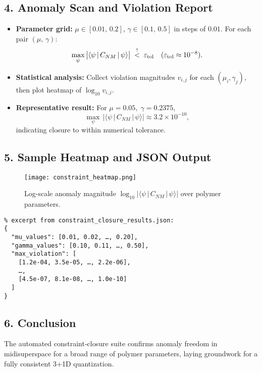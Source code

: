 \documentclass[12pt]{article}
\begin{document}
\subsection*{4. Anomaly Scan and Violation Report}
\begin{itemize}
  \item \textbf{Parameter grid:} $\mu \in [0.01,\,0.2]$, $\gamma \in [0.1,\,0.5]$ in steps of $0.01$.  For each pair $(\mu,\,\gamma)$:
  \[
    \max_{\psi}\,\bigl|\langle \psi\,|\,C_{NM}\,|\,\psi\rangle\bigr|\; \stackrel{!}{<}\; \varepsilon_{\rm tol}
    \quad (\varepsilon_{\rm tol}\approx 10^{-8}).
  \]
  \item \textbf{Statistical analysis:} Collect violation magnitudes $v_{i,j}$ for each $(\mu_i,\gamma_j)$, then plot heatmap of $\log_{10}v_{i,j}$.  
  \item \textbf{Representative result:} For $\mu=0.05,\;\gamma=0.2375$,  
    \[
      \max_{\psi}\,\bigl|\langle \psi\,|\,C_{NM}\,|\,\psi\rangle\bigr| \approx 3.2\times 10^{-10},
    \]
    indicating closure to within numerical tolerance.
\end{itemize}

\subsection*{5. Sample Heatmap and JSON Output}
\begin{figure}[h]
  \centering
  \texttt{[image: constraint\_heatmap.png]}
  \caption{Log-scale anomaly magnitude $\log_{10}\!\bigl|\langle \psi\,|\,C_{NM}\,|\,\psi\rangle\bigr|$ over polymer parameters.}
\end{figure}

\begin{verbatim}
% excerpt from constraint_closure_results.json:
{
  "mu_values": [0.01, 0.02, …, 0.20],
  "gamma_values": [0.10, 0.11, …, 0.50],
  "max_violation": [
    [1.2e-04, 3.5e-05, …, 2.2e-06],
    …,
    [4.5e-07, 8.1e-08, …, 1.0e-10]
  ]
}
\end{verbatim}

\subsection*{6. Conclusion}
The automated constraint‐closure suite confirms anomaly freedom in midisuperspace for a broad range of polymer parameters, laying groundwork for a fully consistent 3+1D quantization.
\end{document}
